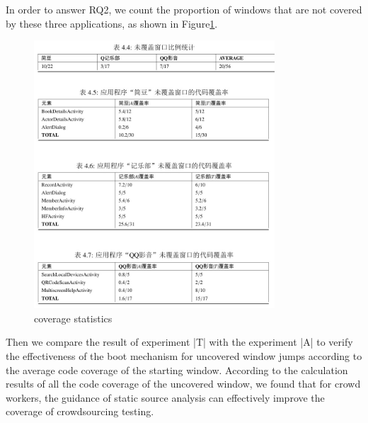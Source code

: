 In order to answer RQ2, we count the proportion of windows that are not covered by these three applications, as shown in Figure\ref{fig:xixi}.
\begin{figure}[htbp]
\centering
\centerline{\includegraphics[width=\columnwidth,height=10cm]{fig/9.png}}
\caption{coverage statistics}
\label{fig:xixi}
\end{figure}

Then we compare the result of experiment |T| with the experiment |A| to verify the effectiveness of the boot mechanism for uncovered window jumps according to the average code coverage of the starting window.
According to the calculation results of all the code coverage of the uncovered window, we found that for crowd workers, the guidance of static source analysis can effectively improve the coverage of crowdsourcing testing.